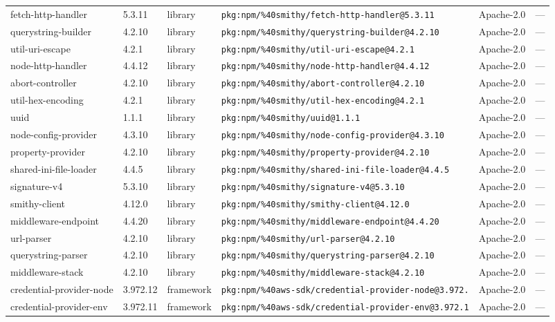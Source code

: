 \documentclass[11pt]{article}
\begin{document}
\begin{longtable}{|l|l|l|p{2.2cm}|l|p{4cm}|}
fetch-http-handler & 5.3.11 & library & \texttt{pkg:npm/\%40smithy/fetch-http-handler@5.3.11} & Apache-2.0 & — \\
querystring-builder & 4.2.10 & library & \texttt{pkg:npm/\%40smithy/querystring-builder@4.2.10} & Apache-2.0 & — \\
util-uri-escape & 4.2.1 & library & \texttt{pkg:npm/\%40smithy/util-uri-escape@4.2.1} & Apache-2.0 & — \\
node-http-handler & 4.4.12 & library & \texttt{pkg:npm/\%40smithy/node-http-handler@4.4.12} & Apache-2.0 & — \\
abort-controller & 4.2.10 & library & \texttt{pkg:npm/\%40smithy/abort-controller@4.2.10} & Apache-2.0 & — \\
util-hex-encoding & 4.2.1 & library & \texttt{pkg:npm/\%40smithy/util-hex-encoding@4.2.1} & Apache-2.0 & — \\
uuid & 1.1.1 & library & \texttt{pkg:npm/\%40smithy/uuid@1.1.1} & Apache-2.0 & — \\
node-config-provider & 4.3.10 & library & \texttt{pkg:npm/\%40smithy/node-config-provider@4.3.10} & Apache-2.0 & — \\
property-provider & 4.2.10 & library & \texttt{pkg:npm/\%40smithy/property-provider@4.2.10} & Apache-2.0 & — \\
shared-ini-file-loader & 4.4.5 & library & \texttt{pkg:npm/\%40smithy/shared-ini-file-loader@4.4.5} & Apache-2.0 & — \\
signature-v4 & 5.3.10 & library & \texttt{pkg:npm/\%40smithy/signature-v4@5.3.10} & Apache-2.0 & — \\
smithy-client & 4.12.0 & library & \texttt{pkg:npm/\%40smithy/smithy-client@4.12.0} & Apache-2.0 & — \\
middleware-endpoint & 4.4.20 & library & \texttt{pkg:npm/\%40smithy/middleware-endpoint@4.4.20} & Apache-2.0 & — \\
url-parser & 4.2.10 & library & \texttt{pkg:npm/\%40smithy/url-parser@4.2.10} & Apache-2.0 & — \\
querystring-parser & 4.2.10 & library & \texttt{pkg:npm/\%40smithy/querystring-parser@4.2.10} & Apache-2.0 & — \\
middleware-stack & 4.2.10 & library & \texttt{pkg:npm/\%40smithy/middleware-stack@4.2.10} & Apache-2.0 & — \\
credential-provider-node & 3.972.12 & framework & \texttt{pkg:npm/\%40aws-sdk/credential-provider-node@3.972.} & Apache-2.0 & — \\
credential-provider-env & 3.972.11 & framework & \texttt{pkg:npm/\%40aws-sdk/credential-provider-env@3.972.1} & Apache-2.0 & — \\

\end{longtable}
\end{document}
